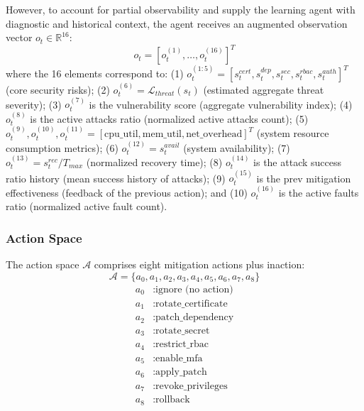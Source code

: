 \documentclass[pdflatex,sn-mathphys-num]{sn-jnl}%
\theoremstyle{thmstyleone}%
\theoremstyle{thmstyletwo}%
\theoremstyle{thmstylethree}%
\begin{document}
	However, to account for partial observability and supply the learning agent with diagnostic and historical context, the agent receives an augmented observation vector $o_t \in \mathbb{R}^{16}$:
	\begin{equation}
		o_t = [o_t^{(1)}, \ldots, o_t^{(16)}]^T
	\end{equation}
	where the 16 elements correspond to: (1) $o_t^{(1:5)} = [s_t^{cert}, s_t^{dep}, s_t^{sec}, s_t^{rbac}, s_t^{auth}]^T$ (core security risks); (2) $o_t^{(6)} = \mathcal{L}_{threat}(s_t)$ (estimated aggregate threat severity); (3) $o_t^{(7)}$ is the vulnerability score (aggregate vulnerability index); (4) $o_t^{(8)}$ is the active attacks ratio (normalized active attacks count); (5) $o_t^{(9)}, o_t^{(10)}, o_t^{(11)} = [\text{cpu\_util}, \text{mem\_util}, \text{net\_overhead}]^T$ (system resource consumption metrics); (6) $o_t^{(12)} = s_t^{avail}$ (system availability); (7) $o_t^{(13)} = s_t^{rec} / T_{max}$ (normalized recovery time); (8) $o_t^{(14)}$ is the attack success ratio history (mean success history of attacks); (9) $o_t^{(15)}$ is the prev mitigation effectiveness (feedback of the previous action); and (10) $o_t^{(16)}$ is the active faults ratio (normalized active fault count).
	
	\subsubsection{Action Space}
	
	The action space $\mathcal{A}$ comprises eight mitigation actions plus inaction:
	\begin{equation}
		\mathcal{A} = \{a_0, a_1, a_2, a_3, a_4, a_5, a_6, a_7, a_8\}
	\end{equation}
	\begin{align}
		a_0 &: \text{ignore (no action)} \nonumber \\
		a_1 &: \text{rotate\_certificate} \nonumber \\
		a_2 &: \text{patch\_dependency} \nonumber \\
		a_3 &: \text{rotate\_secret} \nonumber \\
		a_4 &: \text{restrict\_rbac} \nonumber \\
		a_5 &: \text{enable\_mfa} \nonumber \\
		a_6 &: \text{apply\_patch} \nonumber \\
		a_7 &: \text{revoke\_privileges} \nonumber \\
		a_8 &: \text{rollback} \nonumber
	\end{align}
	
\end{document}
